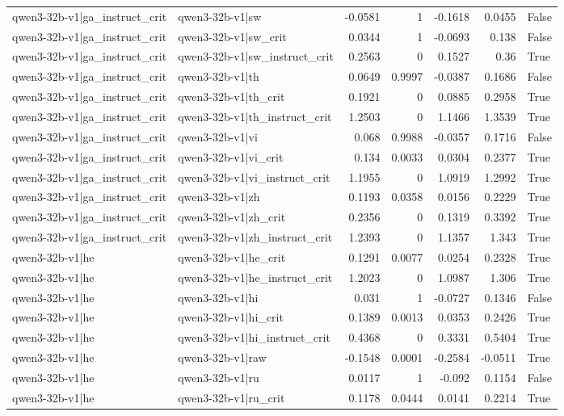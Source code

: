 \begin{table}
\begin{tabular}{l l r r r r l}
qwen3-32b-v1|ga_instruct_crit & qwen3-32b-v1|sw & -0.0581 & 1 & -0.1618 & 0.0455 & False \\
qwen3-32b-v1|ga_instruct_crit & qwen3-32b-v1|sw_crit & 0.0344 & 1 & -0.0693 & 0.138 & False \\
qwen3-32b-v1|ga_instruct_crit & qwen3-32b-v1|sw_instruct_crit & 0.2563 & 0 & 0.1527 & 0.36 & True \\
qwen3-32b-v1|ga_instruct_crit & qwen3-32b-v1|th & 0.0649 & 0.9997 & -0.0387 & 0.1686 & False \\
qwen3-32b-v1|ga_instruct_crit & qwen3-32b-v1|th_crit & 0.1921 & 0 & 0.0885 & 0.2958 & True \\
qwen3-32b-v1|ga_instruct_crit & qwen3-32b-v1|th_instruct_crit & 1.2503 & 0 & 1.1466 & 1.3539 & True \\
qwen3-32b-v1|ga_instruct_crit & qwen3-32b-v1|vi & 0.068 & 0.9988 & -0.0357 & 0.1716 & False \\
qwen3-32b-v1|ga_instruct_crit & qwen3-32b-v1|vi_crit & 0.134 & 0.0033 & 0.0304 & 0.2377 & True \\
qwen3-32b-v1|ga_instruct_crit & qwen3-32b-v1|vi_instruct_crit & 1.1955 & 0 & 1.0919 & 1.2992 & True \\
qwen3-32b-v1|ga_instruct_crit & qwen3-32b-v1|zh & 0.1193 & 0.0358 & 0.0156 & 0.2229 & True \\
qwen3-32b-v1|ga_instruct_crit & qwen3-32b-v1|zh_crit & 0.2356 & 0 & 0.1319 & 0.3392 & True \\
qwen3-32b-v1|ga_instruct_crit & qwen3-32b-v1|zh_instruct_crit & 1.2393 & 0 & 1.1357 & 1.343 & True \\
qwen3-32b-v1|he & qwen3-32b-v1|he_crit & 0.1291 & 0.0077 & 0.0254 & 0.2328 & True \\
qwen3-32b-v1|he & qwen3-32b-v1|he_instruct_crit & 1.2023 & 0 & 1.0987 & 1.306 & True \\
qwen3-32b-v1|he & qwen3-32b-v1|hi & 0.031 & 1 & -0.0727 & 0.1346 & False \\
qwen3-32b-v1|he & qwen3-32b-v1|hi_crit & 0.1389 & 0.0013 & 0.0353 & 0.2426 & True \\
qwen3-32b-v1|he & qwen3-32b-v1|hi_instruct_crit & 0.4368 & 0 & 0.3331 & 0.5404 & True \\
qwen3-32b-v1|he & qwen3-32b-v1|raw & -0.1548 & 0.0001 & -0.2584 & -0.0511 & True \\
qwen3-32b-v1|he & qwen3-32b-v1|ru & 0.0117 & 1 & -0.092 & 0.1154 & False \\
qwen3-32b-v1|he & qwen3-32b-v1|ru_crit & 0.1178 & 0.0444 & 0.0141 & 0.2214 & True \\

\end{tabular}
\end{table}
